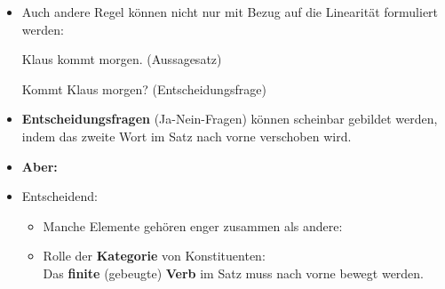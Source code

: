 \begin{frame}

\begin{itemize}
	\item Auch andere Regel können nicht nur mit Bezug auf die Linearität formuliert werden:
	
	\ea Klaus kommt morgen. \hfill (Aussagesatz)
	\z

	\ea Kommt Klaus morgen? \hfill (Entscheidungsfrage)
	\z
	
	\item \textbf{Entscheidungsfragen} (Ja-Nein-Fragen) können scheinbar gebildet werden, indem das zweite Wort im Satz nach vorne verschoben wird.\\
	
	\item[] \textbf{Aber:}

\pause
	
	\z
	
	\z
	
\end{itemize}

\end{frame}


\begin{frame}

\begin{itemize}

	\item Entscheidend:
		\begin{itemize}
			\item Manche Elemente gehören enger zusammen als andere: 

			\z
			
			\item Rolle der \textbf{Kategorie} von Konstituenten:\\
			\ras Das \textbf{finite} (gebeugte) \textbf{Verb} im Satz muss nach vorne bewegt werden.
			
			\z
			
		\end{itemize}

\end{itemize}

\end{frame}



